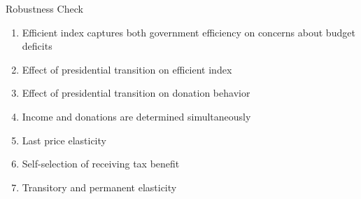 \documentclass[
  ignorenonframetext,
]{beamer}
\providecommand{\tightlist}{%
  \setlength{\itemsep}{0pt}\setlength{\parskip}{0pt}}
\begin{document}
\begin{frame}{Robustness Check}
\protect\hypertarget{robustness-check-3}{}
\begin{enumerate}
\tightlist
\item
  Efficient index captures both government efficiency on concerns about
  budget deficits
\item
  Effect of presidential transition on efficient index
\item
  Effect of presidential transition on donation behavior
\item
  Income and donations are determined simultaneously
\item
  Last price elasticity
\item
  Self-selection of receiving tax benefit
\item
  Transitory and permanent elasticity
\end{enumerate}
\end{frame}
\end{document}
